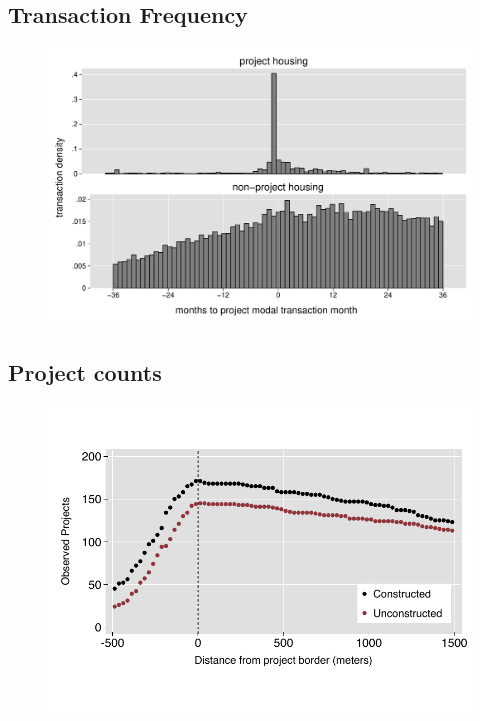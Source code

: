 \documentclass[12pt]{article}
\begin{document}
\subsection{Transaction Frequency}
\label{appendix:histfreq}
\vspace{-5mm}
\begin{figure}[ht!]
\centering
\includegraphics[scale=.4 , trim={.2cm 0.2cm .2cm 0.2cm},clip]{figures/summary_densitytime.pdf}
\end{figure}

\subsection{Project counts}
\label{appendix:projectcounts}
\vspace{-5mm}
\begin{figure}[ht!]
\centering
\includegraphics[scale=1.2,trim={.1cm 1.2cm .1cm 1.2cm},clip]{figures/projectcounts_4.pdf}
\end{figure}
\end{document}
